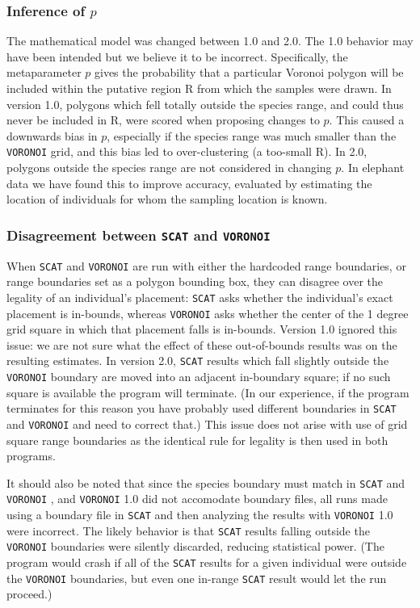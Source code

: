 \documentclass[10pt,titlepage,times,letterpaper]{article}
\def\SCAT{{\tt SCAT} }
\def\VORONOI{{\tt VORONOI} }
\begin{document}
\subsubsection{ Inference of $p$} 
The mathematical model was changed between 1.0 and 2.0.   
The 1.0 behavior may have been
intended but we believe it to be incorrect.   Specifically, the metaparameter
$p$ gives the probability that a particular Voronoi polygon will be included within
the putative region R from which the samples were drawn.  In version 1.0, polygons which
fell totally outside the species range, and could thus never be included in R,
were scored when proposing changes to $p$.  This caused a downwards bias in $p$,
especially if the species range was much smaller than the \VORONOI grid, and this bias
led to over-clustering (a too-small R).  In 2.0, polygons outside the species range
are not considered in changing $p$.  In elephant data we have found this to improve
accuracy, evaluated by estimating the location of individuals for whom the sampling
location is known. 

\subsubsection{ Disagreement between \SCAT and \VORONOI}  
When \SCAT and \VORONOI are 
run with either the hardcoded range boundaries, or range
boundaries set as a polygon bounding box, they can disagree over the legality of an 
individual's placement:  \SCAT asks whether the individual's exact placement is in-bounds,
whereas \VORONOI asks whether the center of the 1 degree grid square in which that
placement falls is in-bounds.  Version 1.0 ignored this issue:  we are not sure what the
effect of these out-of-bounds results was on the resulting estimates.
In version 2.0, \SCAT results which fall slightly outside the
\VORONOI boundary are moved into an adjacent in-boundary square; if no such square is
available the program will terminate.  (In our experience, if the program terminates for
this reason you have probably used different boundaries in \SCAT and \VORONOI and need
to correct that.)   This issue does not arise with use of grid square
range boundaries as the identical rule for legality is then used in both programs.

It should also be noted that since the species boundary must match in \SCAT and \VORONOI,
and \VORONOI 1.0 did not accomodate boundary files, all runs made using a boundary file
in \SCAT and then analyzing the results with \VORONOI 1.0 were incorrect.  The
likely behavior is that \SCAT results falling outside the \VORONOI boundaries were
silently discarded, reducing statistical power.  (The program would crash
if all of the \SCAT results for a given individual were outside the
\VORONOI boundaries, but even one in-range \SCAT result would let the run proceed.)
\end{document}
